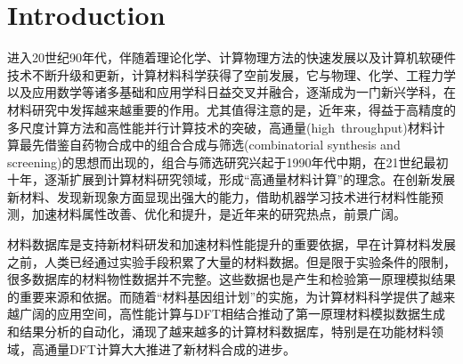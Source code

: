 \documentclass[10pt, oneside, a4paper]{article}      %
\newcommand{\upcite}[1]{\hspace{0ex}\textsuperscript{\cite{#1}}} %
\begin{document}

\newpage	        %
\pagestyle{empty}   %

\section{Introduction}
进入20世纪90年代，伴随着理论化学、计算物理方法的快速发展以及计算机软硬件技术不断升级和更新，计算材料科学获得了空前发展，它与物理、化学、工程力学以及应用数学等诸多基础和应用学科日益交叉并融合，逐渐成为一门新兴学科，在材料研究中发挥越来越重要的作用\upcite{NatMat3-429_2004,App-CataA254-5_2003,JACS125-4306_2003,JCombChem5-472_2003,Meas_Sci-Tech16-1_2005,Nature392-694_1998}。尤其值得注意的是，近年来，得益于高精度的多尺度计算方法和高性能并行计算技术的突破\upcite{PRL88-255506_2002,Nano-Lett3-1183_2003}，高通量(\textrm{high~throughput})材料计算\upcite{Nature410-643_2001}最先借鉴自药物合成中的组合合成与筛选\textrm{(combinatorial synthesis and screening)}的思想而出现的，组合与筛选研究兴起于1990年代中期\upcite{Science268-1738_1995}，在21世纪最初十年，逐渐扩展到计算材料研究领域，形成“高通量材料计算”的理念。在创新发展新材料、发现新现象方面显现出强大的能力，借助机器学习技术进行材料性能预测，加速材料属性改善、优化和提升，是近年来的研究热点，前景广阔。

材料数据库是支持新材料研发和加速材料性能提升的重要依据，早在计算材料发展之前，人类已经通过实验手段积累了大量的材料数据。但是限于实验条件的限制，很多数据库的材料物性数据并不完整。这些数据也是产生和检验第一原理模拟结果的重要来源和依据。而随着“材料基因组计划”的实施，为计算材料科学提供了越来越广阔的应用空间，高性能计算与\textrm{DFT}相结合推动了第一原理材料模拟数据生成和结果分析的自动化，涌现了越来越多的计算材料数据库，特别是在功能材料领域，高通量\textrm{DFT}计算大大推进了新材料合成的进步。\upcite{JCED59-3232_2014, IC53-11849_2014,JPCL4-3607_2013,PCCP16-22073_2014}
\end{document}
